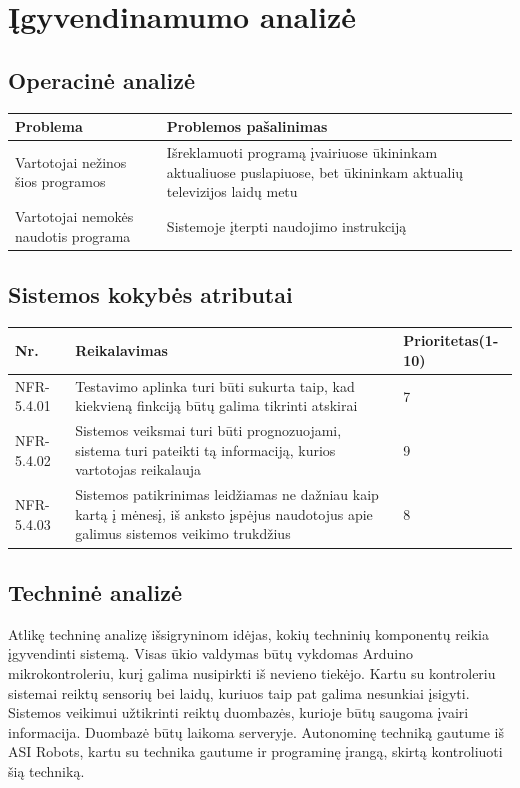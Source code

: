 \documentclass[oneside]{VUMIFPSkursinis}
\begin{document}
\section{Įgyvendinamumo analizė}
	\subsection{Operacinė analizė}
\begin{table}[htbp]
	\begin{tabularx}{1\textwidth}{ |P{7.5cm}|X| }  \hline
		Problema & Problemos pašalinimas \\ \hline
		Vartotojai nežinos šios programos & Išreklamuoti programą įvairiuose ūkininkam aktualiuose puslapiuose, bet ūkininkam aktualių televizijos laidų metu \\ \hline
		Vartotojai nemokės naudotis programa & Sistemoje įterpti naudojimo instrukciją \\ \hline
	\end{tabularx}
\end{table}
\subsection{Sistemos kokybės atributai}
\begin{table}[htbp]
	\begin{tabularx}{1\textwidth}{ |P{2.5cm}|X|P{3cm }| }  \hline
		Nr. & Reikalavimas & Prioritetas(1-10) \\ \hline
		NFR-5.4.01 & Testavimo aplinka turi būti sukurta taip, kad kiekvieną finkciją būtų galima tikrinti atskirai & 7 \\ \hline
		NFR-5.4.02 & Sistemos veiksmai turi būti prognozuojami, sistema turi pateikti tą informaciją, kurios vartotojas reikalauja & 9 \\ \hline
		NFR-5.4.03 & Sistemos patikrinimas leidžiamas ne dažniau kaip kartą į mėnesį, iš anksto įspėjus naudotojus apie galimus sistemos veikimo trukdžius  & 8 \\ \hline
	\end{tabularx}
\end{table}
	\subsection{Techninė analizė}
Atlikę techninę analizę išsigryninom idėjas, kokių techninių komponentų reikia įgyvendinti sistemą. Visas ūkio valdymas būtų vykdomas Arduino mikrokontroleriu, kurį galima nusipirkti iš nevieno tiekėjo. Kartu su kontroleriu sistemai reiktų sensorių bei laidų, kuriuos taip pat galima nesunkiai įsigyti. Sistemos veikimui užtikrinti reiktų duombazės, kurioje būtų saugoma įvairi informacija. Duombazė būtų laikoma serveryje. Autonominę techniką gautume iš ASI Robots, kartu su technika gautume ir programinę įrangą, skirtą kontroliuoti šią techniką.
\end{document}
